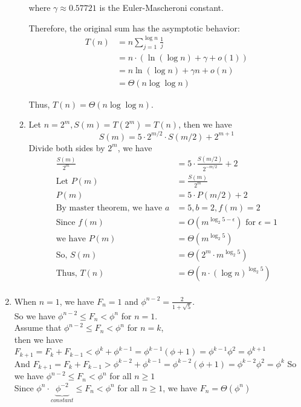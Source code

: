 \documentclass[letterpaper, 11pt]{article}
\newcommand{\1}{\mathds{1}}	%
\theoremstyle{definition}
\newenvironment{solution}{{\par\noindent\it Solution.}}{}
\begin{document}
\begin{solution}
\begin{enumerate}
\begin{enumerate}
            where $\gamma \approx 0.57721$ is the Euler-Mascheroni constant.
            
            Therefore, the original sum has the asymptotic behavior:
            \begin{align*}
            T(n) &= n \sum_{j=1}^{\log n} \frac{1}{j} \\
            &= n \cdot (\ln(\log n) + \gamma + o(1)) \\
            &= n\ln(\log n) + \gamma n + o(n) \\
            &= \Theta(n\log\log n)
            \end{align*}
            
            Thus, $T(n) = \Theta(n\log\log n)$.
            \item Let $ n=2^m,S(m)=T(2^m)=T(n) $, then we have
            $$
                S(m)=5\cdot 2^{m/2}\cdot S(m/2)+2^{m+1}
            $$ 
            Divide both sides by $2^{m}$, we have
            \begin{align*}{}{}
            \frac{S(m)}{2^{m}}&=5\cdot \frac{S(m/2)}{2^{-m/2}}+2\\
            \text{Let }P(m)&=\frac{S(m)}{2^{m}}\\
            P(m)&=5\cdot P(m/2)+2\\
            \text{By master theorem, we have }a&=5, b=2, f(m)=2\\
            \text{Since }f(m)&=O(m^{\log_2 5-\epsilon}) \text{ for } \epsilon=1\\
            \text{we have }P(m)&=\Theta(m^{\log_2 5})\\
            \text{So, }S(m)&=\Theta(2^m\cdot m^{\log_2 5})\\
            \text{Thus, }T(n)&=\Theta(n\cdot (\log n)^{\log_2 5})\\
            \end{align*}
        \end{enumerate}
        \item When $n=1$, we have $F_n=1$ and $\phi^{n-2}=\frac{2}{1+\sqrt{5}}$.\\
        So we have $\phi^{n-2} \leq F_n < \phi^n$ for $n=1$.\\
        Assume that $\phi^{n-2} \leq F_n < \phi^n$ for $n=k$, \\
        then we have $F_{k+1}=F_k+F_{k-1}<\phi^k+\phi^{k-1}=\phi^{k-1}(\phi+1)=\phi^{k-1}\phi^2=\phi^{k+1}$\\
        And $F_{k+1}=F_k+F_{k-1}>\phi^{k-2}+\phi^{k-1}=\phi^{k-2}(\phi+1)=\phi^{k-2}\phi^2=\phi^{k}$
        So we have $\phi^{n-2} \leq F_n < \phi^n$ for all $n \geq 1$\\
        Since $\phi^{n}\cdot \underbrace{\phi^{-2}}_{constant} \leq F_n < \phi^n$ for all $n \geq 1$, we have $F_n = \Theta(\phi^n)$
    \end{enumerate}
\end{solution}
\end{document}
